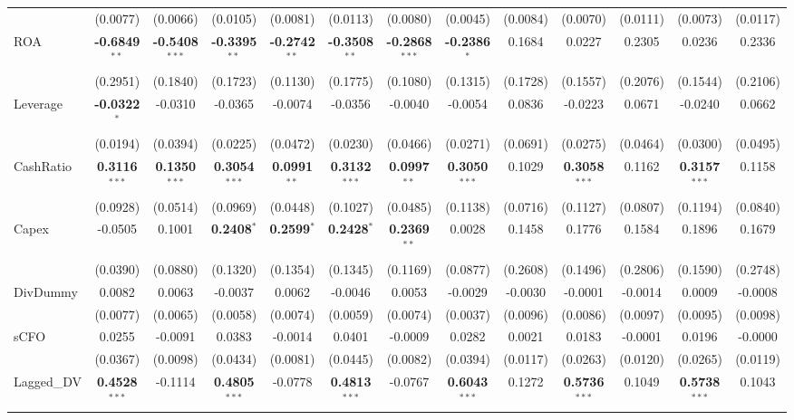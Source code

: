 \documentclass[11pt,a4paper]{article}
\begin{document}
\begin{table}[htbp]
\begin{tabular}{lcccccccccccc}
 & (0.0077) & (0.0066) & (0.0105) & (0.0081) & (0.0113) & (0.0080) & (0.0045) & (0.0084) & (0.0070) & (0.0111) & (0.0073) & (0.0117) \\
ROA & \textbf{-0.6849}$^{**}$ & \textbf{-0.5408}$^{***}$ & \textbf{-0.3395}$^{**}$ & \textbf{-0.2742}$^{**}$ & \textbf{-0.3508}$^{**}$ & \textbf{-0.2868}$^{***}$ & \textbf{-0.2386}$^{*}$ & 0.1684 & 0.0227 & 0.2305 & 0.0236 & 0.2336 \\
 & (0.2951) & (0.1840) & (0.1723) & (0.1130) & (0.1775) & (0.1080) & (0.1315) & (0.1728) & (0.1557) & (0.2076) & (0.1544) & (0.2106) \\
Leverage & \textbf{-0.0322}$^{*}$ & -0.0310 & -0.0365 & -0.0074 & -0.0356 & -0.0040 & -0.0054 & 0.0836 & -0.0223 & 0.0671 & -0.0240 & 0.0662 \\
 & (0.0194) & (0.0394) & (0.0225) & (0.0472) & (0.0230) & (0.0466) & (0.0271) & (0.0691) & (0.0275) & (0.0464) & (0.0300) & (0.0495) \\
CashRatio & \textbf{0.3116}$^{***}$ & \textbf{0.1350}$^{***}$ & \textbf{0.3054}$^{***}$ & \textbf{0.0991}$^{**}$ & \textbf{0.3132}$^{***}$ & \textbf{0.0997}$^{**}$ & \textbf{0.3050}$^{***}$ & 0.1029 & \textbf{0.3058}$^{***}$ & 0.1162 & \textbf{0.3157}$^{***}$ & 0.1158 \\
 & (0.0928) & (0.0514) & (0.0969) & (0.0448) & (0.1027) & (0.0485) & (0.1138) & (0.0716) & (0.1127) & (0.0807) & (0.1194) & (0.0840) \\
Capex & -0.0505 & 0.1001 & \textbf{0.2408}$^{*}$ & \textbf{0.2599}$^{*}$ & \textbf{0.2428}$^{*}$ & \textbf{0.2369}$^{**}$ & 0.0028 & 0.1458 & 0.1776 & 0.1584 & 0.1896 & 0.1679 \\
 & (0.0390) & (0.0880) & (0.1320) & (0.1354) & (0.1345) & (0.1169) & (0.0877) & (0.2608) & (0.1496) & (0.2806) & (0.1590) & (0.2748) \\
DivDummy & 0.0082 & 0.0063 & -0.0037 & 0.0062 & -0.0046 & 0.0053 & -0.0029 & -0.0030 & -0.0001 & -0.0014 & 0.0009 & -0.0008 \\
 & (0.0077) & (0.0065) & (0.0058) & (0.0074) & (0.0059) & (0.0074) & (0.0037) & (0.0096) & (0.0086) & (0.0097) & (0.0095) & (0.0098) \\
sCFO & 0.0255 & -0.0091 & 0.0383 & -0.0014 & 0.0401 & -0.0009 & 0.0282 & 0.0021 & 0.0183 & -0.0001 & 0.0196 & -0.0000 \\
 & (0.0367) & (0.0098) & (0.0434) & (0.0081) & (0.0445) & (0.0082) & (0.0394) & (0.0117) & (0.0263) & (0.0120) & (0.0265) & (0.0119) \\
Lagged\_DV & \textbf{0.4528}$^{***}$ & -0.1114 & \textbf{0.4805}$^{***}$ & -0.0778 & \textbf{0.4813}$^{***}$ & -0.0767 & \textbf{0.6043}$^{***}$ & 0.1272 & \textbf{0.5736}$^{***}$ & 0.1049 & \textbf{0.5738}$^{***}$ & 0.1043 \\

\end{tabular}
\end{table}
\end{document}
